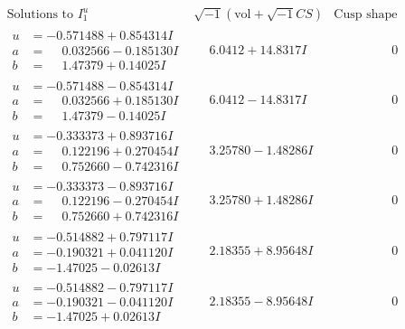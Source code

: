 \documentclass[1p]{elsarticle_modified}
\theoremstyle{definition}
\newcommand{\I}{\sqrt{-1}}
\begin{document}
$$\begin{array}{c|c|c}  
\text{Solutions to }I^u_{1}& \I (\text{vol} + \sqrt{-1}CS) & \text{Cusp shape}\\
 \hline 
\begin{aligned}
u &= -0.571488 + 0.854314 I \\
a &= \phantom{-}0.032566 - 0.185130 I \\
b &= \phantom{-}1.47379 + 0.14025 I\end{aligned}
 & \phantom{-}6.0412 + 14.8317 I & \phantom{-0.000000 } 0 \\ \hline\begin{aligned}
u &= -0.571488 - 0.854314 I \\
a &= \phantom{-}0.032566 + 0.185130 I \\
b &= \phantom{-}1.47379 - 0.14025 I\end{aligned}
 & \phantom{-}6.0412 - 14.8317 I & \phantom{-0.000000 } 0 \\ \hline\begin{aligned}
u &= -0.333373 + 0.893716 I \\
a &= \phantom{-}0.122196 + 0.270454 I \\
b &= \phantom{-}0.752660 - 0.742316 I\end{aligned}
 & \phantom{-}3.25780 - 1.48286 I & \phantom{-0.000000 } 0 \\ \hline\begin{aligned}
u &= -0.333373 - 0.893716 I \\
a &= \phantom{-}0.122196 - 0.270454 I \\
b &= \phantom{-}0.752660 + 0.742316 I\end{aligned}
 & \phantom{-}3.25780 + 1.48286 I & \phantom{-0.000000 } 0 \\ \hline\begin{aligned}
u &= -0.514882 + 0.797117 I \\
a &= -0.190321 + 0.041120 I \\
b &= -1.47025 - 0.02613 I\end{aligned}
 & \phantom{-}2.18355 + 8.95648 I & \phantom{-0.000000 } 0 \\ \hline\begin{aligned}
u &= -0.514882 - 0.797117 I \\
a &= -0.190321 - 0.041120 I \\
b &= -1.47025 + 0.02613 I\end{aligned}
 & \phantom{-}2.18355 - 8.95648 I & \phantom{-0.000000 } 0 \\ \hline\begin{aligned}

\end{aligned}
\end{array}$$
\end{document}
